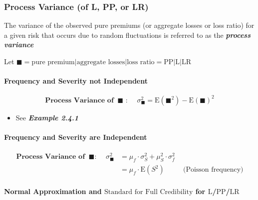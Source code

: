 \documentclass[
]{article}
\providecommand{\tightlist}{%
  \setlength{\itemsep}{0pt}\setlength{\parskip}{0pt}}
\begin{document}
\begin{orange}

\hypertarget{process-variance-of-l-pp-or-lr}{%
\subsubsection{Process Variance (of L, PP, or
LR)}\label{process-variance-of-l-pp-or-lr}}

The variance of the observed pure premiums (or aggregate losses or loss
ratio) for a given risk that occurs due to random fluctuations is
referred to as the \textbf{\emph{process variance}}

Let
\(\blacksquare = \text{pure premium|aggregate losses|loss ratio} = \text{PP|L|LR}\)

\hypertarget{frequency-and-severity-not-independent}{%
\paragraph{Frequency and Severity not
Independent}\label{frequency-and-severity-not-independent}}

\[
  \textbf{Process Variance of  } \ \blacksquare \text{ : } \quad \sigma_{\blacksquare}^2 = \text{E}(\blacksquare^2) - \text{E}(\blacksquare)^2 
\]

\begin{itemize}
\tightlist
\item
  See \textbf{\emph{Example 2.4.1}}
\end{itemize}

\hypertarget{frequency-and-severity-are-independent}{%
\paragraph{Frequency and Severity are
Independent}\label{frequency-and-severity-are-independent}}

\[
  \begin{align}
    \textbf{Process Variance of } \ \blacksquare \text{: } \quad \sigma_{\blacksquare}^2 &= \mu_f \cdot \sigma_S^2 + \mu_S^2 \cdot \sigma_f^2 \\
    &= \mu_f \cdot  \text{E}(S^2)  \quad \quad \ \ \ \text{(Poisson frequency)}
  \end{align}
\]

\hypertarget{normal-approximation-and-textstandard-for-full-credibility-for-textltextpptextlr}{%
\paragraph{\texorpdfstring{Normal Approximation and
\(\text{Standard for Full Credibility}\) for
\(\text{L}\)/\(\text{PP}\)/\(\text{LR}\)}{Normal Approximation and \textbackslash text\{Standard for Full Credibility\} for \textbackslash text\{L\}/\textbackslash text\{PP\}/\textbackslash text\{LR\}}}\label{normal-approximation-and-textstandard-for-full-credibility-for-textltextpptextlr}}


\end{orange}
\end{document}
